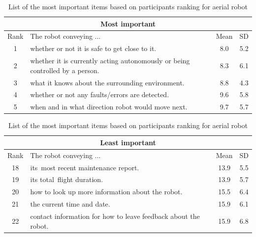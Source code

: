 \documentclass[letterpaper, 10 pt, conference]{ieeeconf}  %
\begin{document}
\begin {table}
\begin{center}
\label{table:bebop}
\begin{tabular}{|c|p{160pt}|c|c|}
 \hline
 \multicolumn{4}{|c|}{Most important} \\
 \hline
 Rank & The robot conveying ... & Mean & SD \\
 \hline
 \rowcolor{Gray}
 1 & whether or not it is safe to get close to it. & 8.0 & 5.2\\
 \hline
 \rowcolor{Gray}
2 & whether it is currently acting autonomously or being controlled by a person. & 8.3 & 6.1\\
 \hline
 \rowcolor{Gray}
3 & what it knows about the surrounding environment. & 8.8 & 4.3\\
 \hline
4 & whether or not any faults/errors are detected. & 9.6 & 5.8\\
 \hline
5 & when and in what direction robot would move next. & 9.7 & 5.7\\
 \hline
\end{tabular}

\vspace*{0.5 cm}

\begin{tabular}{|c|p{160pt}|c|c|}
 \hline
  \multicolumn{4}{|c|}{Least important} \\
 \hline
 Rank & The robot conveying ... & Mean & SD \\
 \hline
18 & its most recent maintenance report. & 13.9 & 5.5 \\
 \hline
19 & its total flight duration. & 13.9 & 5.7 \\
 \hline
 \rowcolor{Gray}
20 & how to look up more information about the robot. & 15.5 & 6.4 \\
 \hline
 \rowcolor{Gray}
21 & the current time and date. & 15.9 & 6.1 \\
 \hline
 \rowcolor{Gray}
22 & contact information for how to leave feedback about the robot. & 15.9 & 6.8 \\
 \hline
 
\end{tabular}
\end{center}

\caption{List of the most important items based on participants ranking for aerial robot}
\end{table}
\end{document}
